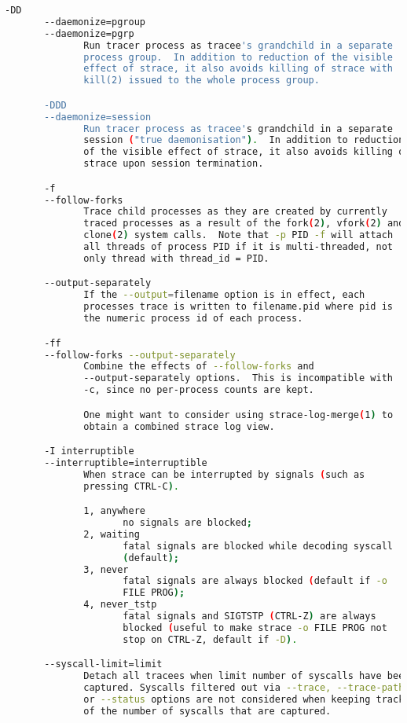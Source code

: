 {{\begin{lstlisting}[language=bash]
       -DD
       --daemonize=pgroup
       --daemonize=pgrp
              Run tracer process as tracee's grandchild in a separate
              process group.  In addition to reduction of the visible
              effect of strace, it also avoids killing of strace with
              kill(2) issued to the whole process group.

       -DDD
       --daemonize=session
              Run tracer process as tracee's grandchild in a separate
              session ("true daemonisation").  In addition to reduction
              of the visible effect of strace, it also avoids killing of
              strace upon session termination.

       -f
       --follow-forks
              Trace child processes as they are created by currently
              traced processes as a result of the fork(2), vfork(2) and
              clone(2) system calls.  Note that -p PID -f will attach
              all threads of process PID if it is multi-threaded, not
              only thread with thread_id = PID.

       --output-separately
              If the --output=filename option is in effect, each
              processes trace is written to filename.pid where pid is
              the numeric process id of each process.

       -ff
       --follow-forks --output-separately
              Combine the effects of --follow-forks and
              --output-separately options.  This is incompatible with
              -c, since no per-process counts are kept.

              One might want to consider using strace-log-merge(1) to
              obtain a combined strace log view.

       -I interruptible
       --interruptible=interruptible
              When strace can be interrupted by signals (such as
              pressing CTRL-C).

              1, anywhere
                     no signals are blocked;
              2, waiting
                     fatal signals are blocked while decoding syscall
                     (default);
              3, never
                     fatal signals are always blocked (default if -o
                     FILE PROG);
              4, never_tstp
                     fatal signals and SIGTSTP (CTRL-Z) are always
                     blocked (useful to make strace -o FILE PROG not
                     stop on CTRL-Z, default if -D).

       --syscall-limit=limit
              Detach all tracees when limit number of syscalls have been
              captured. Syscalls filtered out via --trace, --trace-path
              or --status options are not considered when keeping track
              of the number of syscalls that are captured.


\end{lstlisting}}}
